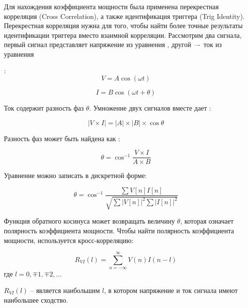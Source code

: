 Для нахождения коэффициента мощности была применена перекрестная корреляция (Cross Correlation), а также идентификация триггера (Trig Identity). Перекрестная корреляция нужна для того, чтобы найти более точные результаты идентификации триггера вместо взаимной корреляции. Рассмотрим два сигнала, первый сигнал представляет напряжение из уравнения , другой~–-~ток из уравнения 

:
\begin{equation}
\label{eq:equation4}
V = A \cos(\omega t)
\end{equation}

\begin{equation}
\label{eq:equation5}
I = B \cos (\omega t + \theta)
\end{equation}

Ток содержит разность фаз $\theta$. Умножение двух сигналов вместе дает :

\begin{equation}
\label{eq:equation6}
\left| {V \times I}\right| = \left|A \right| \times \left|B \right| \times \cos \theta  
\end{equation}

Разность фаз может быть найдена как :

\begin{equation}
\label{eq:equation7}
\theta = \cos^{-1} \frac{V \times I}{A \times B}  
\end{equation}

Уравнение  можно записать в дискретной форме:

\begin{equation}
\label{eq:equation8}
\theta = \cos^{-1} \frac{\sum V\left[ n \right] I\left[ n \right]}{\sqrt{\sum{{\left| V\left[ n \right]\right|}^2} \sum{{\left| I\left[ n \right]\right|}^2}}}
\end{equation}

Функция обратного косинуса может возвращать величину $\theta$, которая означает полярность коэффициента мощности. Чтобы найти полярность коэффициента мощности, используется кросс-корреляцию:

\begin{equation}
\label{eq:equation9}
R_{VI}(l) = \sum_{n=-\infty}^{\infty}V(n)I(n-l)
\end{equation}
где $l=0,\mp1,\mp2,\dots$

$R_{VI}(l)$ -- является наибольшим $l$, в котором напряжение и ток сигнала имеют наибольшее сходство.

